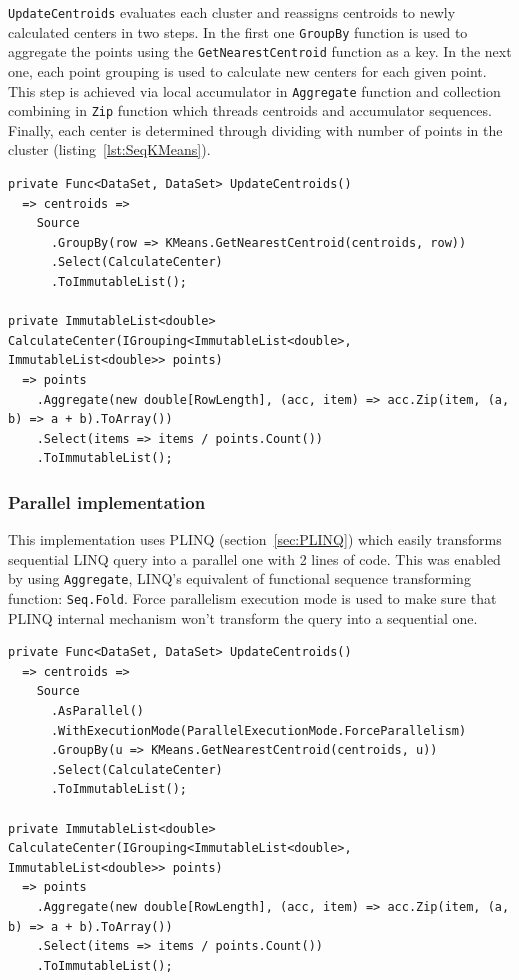 \texttt{UpdateCentroids} evaluates each cluster and reassigns centroids to newly calculated centers in two steps. In the first one \texttt{GroupBy} function is used to aggregate the points using the \texttt{GetNearestCentroid} function as a key. In the next one, each point grouping is used to calculate new centers for each given point. This step is achieved via local accumulator in \texttt{Aggregate} function and collection combining in \texttt{Zip} function which threads centroids and accumulator sequences. Finally, each center is determined through dividing with number of points in the cluster (listing~\ref{lst:SeqKMeans}).


\begin{lstlisting}[style=sharpcstyle, caption={Sequential \texttt{k-means} algorithm}, label={lst:SeqKMeans},
numbers=none, xleftmargin=0pt,framexleftmargin=0pt,framexrightmargin=0pt,framexbottommargin=0pt]
private Func<DataSet, DataSet> UpdateCentroids()
  => centroids =>
    Source
      .GroupBy(row => KMeans.GetNearestCentroid(centroids, row))
      .Select(CalculateCenter)
      .ToImmutableList();

private ImmutableList<double> CalculateCenter(IGrouping<ImmutableList<double>, ImmutableList<double>> points) 
  => points
    .Aggregate(new double[RowLength], (acc, item) => acc.Zip(item, (a, b) => a + b).ToArray())
    .Select(items => items / points.Count())
    .ToImmutableList();
\end{lstlisting}

\subsubsection{Parallel implementation}

This implementation uses PLINQ (section~\ref{sec:PLINQ}) which easily transforms sequential LINQ query into a parallel one with 2 lines of code.
This was enabled by using \texttt{Aggregate}, LINQ's equivalent of functional sequence transforming function: \texttt{Seq.Fold}. Force parallelism execution mode is used to make sure that PLINQ internal mechanism won't transform the query into a sequential one.

\begin{lstlisting}[style=sharpcstyle, caption={Parallel \texttt{k-means} algorithm}, label={lst:ParKMeans},
numbers=none, xleftmargin=0pt,framexleftmargin=0pt,framexrightmargin=0pt,framexbottommargin=0pt]
private Func<DataSet, DataSet> UpdateCentroids()
  => centroids =>
    Source
      .AsParallel()
      .WithExecutionMode(ParallelExecutionMode.ForceParallelism)
      .GroupBy(u => KMeans.GetNearestCentroid(centroids, u))
      .Select(CalculateCenter)
      .ToImmutableList();

private ImmutableList<double> CalculateCenter(IGrouping<ImmutableList<double>, ImmutableList<double>> points)
  => points
    .Aggregate(new double[RowLength], (acc, item) => acc.Zip(item, (a, b) => a + b).ToArray())
    .Select(items => items / points.Count())
    .ToImmutableList();
\end{lstlisting}

